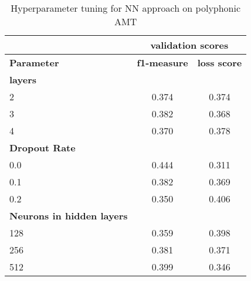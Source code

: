 \begin{table}
    \centering
    \begin{tabular}{|l|c|c|}
        \hline
                                          & \multicolumn{2}{c|}{\textbf{validation scores}}                                            \\ \hline
        \textbf{Parameter}                & \multicolumn{1}{l|}{\textbf{f1-measure}}        & \multicolumn{1}{l|}{\textbf{loss score}} \\ \hline
        \textbf{layers}                   & \multicolumn{1}{l|}{}                           & \multicolumn{1}{l|}{}                    \\ \hline
        2                                 & 0.374                                           & 0.374                                    \\ \hline
        3                                 & 0.382                                           & 0.368                                    \\ \hline
        4                                 & 0.370                                           & 0.378                                    \\ \hline
        \textbf{Dropout Rate}             & \multicolumn{1}{l|}{}                           & \multicolumn{1}{l|}{}                    \\ \hline
        0.0                               & 0.444                                           & 0.311                                    \\ \hline
        0.1                               & 0.382                                           & 0.369                                    \\ \hline
        0.2                               & 0.350                                           & 0.406                                    \\ \hline
        \textbf{Neurons in hidden layers} & \multicolumn{1}{l|}{}                           & \multicolumn{1}{l|}{}                    \\ \hline
        128                               & 0.359                                           & 0.398                                    \\ \hline
        256                               & 0.381                                           & 0.371                                    \\ \hline
        512                               & 0.399                                           & 0.346                                    \\ \hline
    \end{tabular}
    \caption[Hyperparameter gridsearch \ac{NN}]{Hyperparameter tuning for \ac{NN} approach on polyphonic \ac{AMT}}
    \label{results:table:nn-grid}
\end{table}


